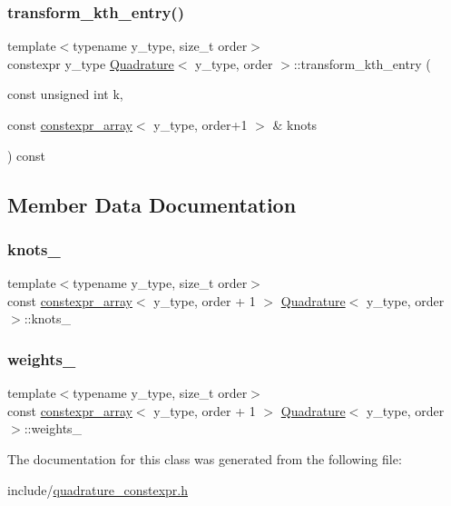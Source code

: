 \mbox{\label{class_quadrature_a760b6b2c4560afa7218533136a00d0ed}} 
\subsubsection{\texorpdfstring{transform\+\_\+kth\+\_\+entry()}{transform\_kth\_entry()}}
{\footnotesize\ttfamily template$<$typename y\+\_\+type, size\+\_\+t order$>$ \\
constexpr y\+\_\+type \hyperlink{class_quadrature}{Quadrature}$<$ y\+\_\+type, order $>$\+::transform\+\_\+kth\+\_\+entry (\begin{DoxyParamCaption}\item[{const unsigned int}]{k,  }\item[{const \hyperlink{classconstexpr__array}{constexpr\+\_\+array}$<$ y\+\_\+type, order+1 $>$ \&}]{knots }\end{DoxyParamCaption}) const\hspace{0.3cm}{\ttfamily [inline]}}



\subsection{Member Data Documentation}
\mbox{\label{class_quadrature_ac953b6311f9120fd2c0d8e5bc0d47a8a}} 
\subsubsection{\texorpdfstring{knots\+\_\+}{knots\_}}
{\footnotesize\ttfamily template$<$typename y\+\_\+type, size\+\_\+t order$>$ \\
const \hyperlink{classconstexpr__array}{constexpr\+\_\+array}$<$ y\+\_\+type, order + 1 $>$ \hyperlink{class_quadrature}{Quadrature}$<$ y\+\_\+type, order $>$\+::knots\+\_\+}

\mbox{\label{class_quadrature_a333f9daea5b493b74ded779ae4a7c8c9}} 
\subsubsection{\texorpdfstring{weights\+\_\+}{weights\_}}
{\footnotesize\ttfamily template$<$typename y\+\_\+type, size\+\_\+t order$>$ \\
const \hyperlink{classconstexpr__array}{constexpr\+\_\+array}$<$ y\+\_\+type, order + 1 $>$ \hyperlink{class_quadrature}{Quadrature}$<$ y\+\_\+type, order $>$\+::weights\+\_\+}



The documentation for this class was generated from the following file\+:\begin{DoxyCompactItemize}
\item 
include/\hyperlink{quadrature__constexpr_8h}{quadrature\+\_\+constexpr.\+h}\end{DoxyCompactItemize}
